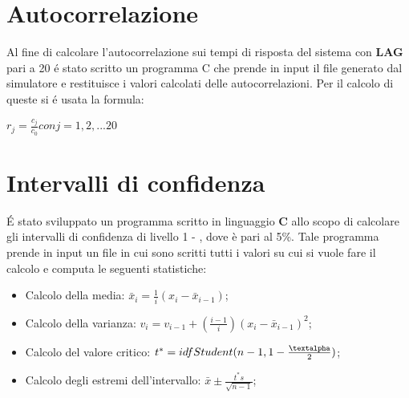 \section{Autocorrelazione}
Al fine di calcolare l'autocorrelazione sui tempi di risposta del sistema con \textbf{LAG} pari a 20 \'e stato scritto un programma C che prende in input il file generato dal simulatore e restituisce i valori calcolati delle autocorrelazioni. Per il calcolo di queste si \'e usata la formula:

\vspace{0.5cm}
\begin{center} $r_{j} = \frac{c_{j}}{c_{0}} con j = 1,2,...20$\end{center}

\section{Intervalli di confidenza}
\'E stato sviluppato un programma scritto in linguaggio \textbf{C} allo scopo di calcolare gli intervalli di confidenza di livello 1 - \textalpha, dove \textalpha è pari al 5\%. Tale programma prende in input un file in cui sono scritti tutti i valori su cui si vuole fare il calcolo e computa le seguenti statistiche:
\begin{itemize}
 \item Calcolo della media: $\bar{x}_{i} = \frac{1}{i}(x_{i} - \bar{x}_{i-1})$;
 \item Calcolo della varianza: $v_{i} = v_{i-1} + (\frac{i-1}{i}){(x_{i} - \bar{x}_{i-1})}^{2}$;
 \item Calcolo del valore critico: $t^{*} = idfStudent(n-1, 1-\frac{\textalpha}{2})$;
 \item Calcolo degli estremi dell'intervallo: $\bar{x} \pm \frac{t^{*}s}{\sqrt{n-1}}$;
\end{itemize}